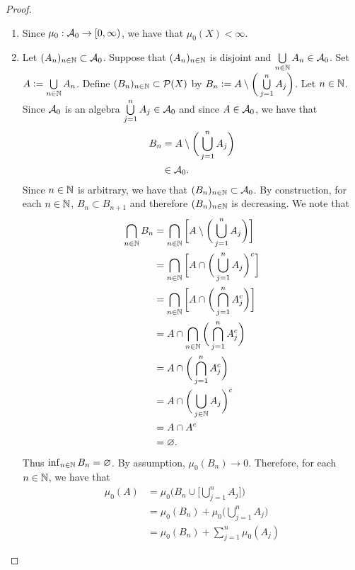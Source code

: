 \documentclass{book}
\begin{document}
	\begin{proof}\
		\begin{enumerate}
			\item Since $\mu_0:\mathcal{A}_0 \rightarrow [0, \infty)$, we have that $\mu_0(X) < \infty$.
			\item Let $(A_n)_{n \in \mathbb{N}} \subset \mathcal{A}_0$. Suppose that $(A_n)_{n \in \mathbb{N}}$ is disjoint and $\bigcup\limits_{n \in \mathbb{N}} A_n \in \mathcal{A}_0$. Set $A \vcentcolon= \bigcup\limits_{n \in \mathbb{N}} A_n$. Define $(B_n)_{n \in \mathbb{N}} \subset \mathcal{P}(X)$ by $B_n \vcentcolon= A \setminus \bigg( \bigcup\limits_{j =1}^n A_j \bigg)$. Let $n \in \mathbb{N}$. Since $\mathcal{A}_0$ is an algebra $\bigcup\limits_{j =1}^n A_j \in \mathcal{A}_0$ and since $A \in \mathcal{A}_0$, we have that
			\begin{align*}
				B_n 
				& = A \setminus \bigg( \bigcup\limits_{j =1}^n A_j \bigg) \\
				& \in \mathcal{A}_0.
			\end{align*} 
			Since $n \in \mathbb{N}$ is arbitrary, we have that $(B_n)_{n \in \mathbb{N}} \subset \mathcal{A}_0$. By construction, for each $n \in \mathbb{N}$, $B_n \subset B_{n+1}$ and therefore $(B_n)_{n \in \mathbb{N}}$ is decreasing. We note that
			\begin{align*}
				\bigcap_{n \in \mathbb{N}} B_n
				& = \bigcap_{n \in \mathbb{N}} \bigg[ A \setminus \bigg( \bigcup\limits_{j =1}^n A_j \bigg) \bigg] \\
				& = \bigcap_{n \in \mathbb{N}} \bigg[ A \cap \bigg( \bigcup\limits_{j =1}^n A_j \bigg)^c \bigg] \\
				& = \bigcap_{n \in \mathbb{N}} \bigg[ A \cap \bigg( \bigcap\limits_{j =1}^n A_j^c \bigg) \bigg] \\
				& = A \cap \bigcap_{n \in \mathbb{N}} \bigg( \bigcap\limits_{j =1}^n A_j^c  \bigg) \\
				& = A \cap \bigg( \bigcap\limits_{j =1}^n A_j^c \bigg) \\
				& = A \cap \bigg( \bigcup\limits_{j \in \mathbb{N}} A_j \bigg)^c \\
				& = A \cap A^c \\
				& = \varnothing.
			\end{align*} 
			Thus $\inf_{n \in \mathbb{N}} B_n = \varnothing$. By assumption, $\mu_0(B_n) \rightarrow 0$. Therefore, for each $n \in \mathbb{N}$, we have that 
			\begin{align*}
				\mu_0(A)
				& = \mu_0 \bigg( B_n \cup \bigg[ \bigcup\limits_{j=1}^n A_j \bigg]  \bigg) \\
				& = \mu_0(B_n) + \mu_0\bigg( \bigcup\limits_{j=1}^n A_j  \bigg) \\
				& = \mu_0(B_n) + \sum\limits_{j=1}^n \mu_0(A_j) 

\end{align*}
\end{enumerate}
\end{proof}
\end{document}
